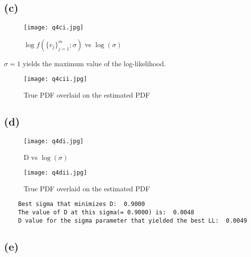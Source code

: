 \documentclass[11pt, fleqn]{article}
\begin{document}
\subsection*{(c)}
\begin{figure}[H]
    \centering
    \texttt{[image: q4ci.jpg]}
    \caption{$\log f(\{v_j\}_{j=1}^{m}; \sigma)$ vs $\log(\sigma)$}
    \label{fig:my_label}
\end{figure}

$\boxed{\sigma = 1 }$ yields the maximum value of the log-likelihood.

\begin{figure}[H]
    \centering
    \texttt{[image: q4cii.jpg]}
    \caption{True PDF overlaid on the estimated PDF}
    \label{fig:my_label}
\end{figure}
\newpage

\subsection*{(d)}
\begin{figure}[H]
    \centering
    \texttt{[image: q4di.jpg]}
    \caption{D vs $\log(\sigma)$}
    \label{fig:my_label}
\end{figure}

\begin{figure}[H]
    \centering
    \texttt{[image: q4dii.jpg]}
    \caption{True PDF overlaid on the estimated PDF}
    \label{fig:my_label}
\end{figure}
\newpage

\begin{verbatim}
    Best sigma that minimizes D:  0.9000
    The value of D at this sigma(= 0.9000) is:  0.0048
    D value for the sigma parameter that yielded the best LL:  0.0049
\end{verbatim}

\subsection*{(e)}
\end{document}
